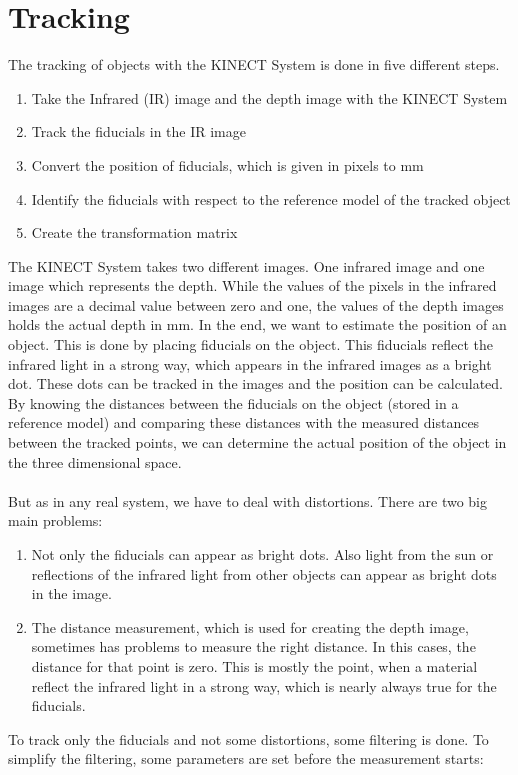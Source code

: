 \section{Tracking}
The tracking of objects with the KINECT System is done in five different steps. 
\begin{enumerate}
\item Take the Infrared (IR) image and the depth image with the KINECT System
\item Track the fiducials in the IR image
\item Convert the position of fiducials, which is given in pixels to mm
\item Identify the fiducials with respect to the reference model of the tracked object
\item Create the transformation matrix
\end{enumerate}
The KINECT System takes two different images. One infrared image and one image which represents the depth. While the values of the pixels in the infrared images are a decimal value between zero and one, the values of the depth images holds the actual depth in mm. In the end, we want to estimate the position of an object. This is done by placing fiducials on the object. This fiducials reflect the infrared light in a strong way, which appears in the infrared images as a bright dot. These dots can be tracked in the images and the position can be calculated. By knowing the distances between the fiducials on the object (stored in a reference model) and comparing these distances with the measured distances between the tracked points, we can determine the actual position of the object in the three dimensional space.
\\ \\But as in any real system, we have to deal with distortions. There are two big main problems:
\begin{enumerate}
\item Not only the fiducials can appear as bright dots. Also light from the sun or reflections of the infrared light from other objects can appear as bright dots in the image.
\item The distance measurement, which is used for creating the depth image, sometimes has problems to measure the right distance. In this cases, the distance for that point is zero. This is mostly the point, when a material reflect the infrared light in a strong way, which is nearly always true for the fiducials.
\end{enumerate}
To track only the fiducials and not some distortions, some filtering is done. To simplify the filtering, some parameters are set before the measurement starts:
